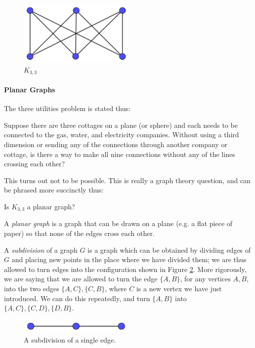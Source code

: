 	\begin{figure}[h]
		\centering
		\includegraphics[width=0.5\textwidth]{utilitygraph}
		\caption{\(K_{3,3}\)}
		\label{utilitygraph}
	\end{figure}
	
	\paragraph{Planar Graphs}
	
	The three utilities problem is stated thus:
	
	\begin{displayquote}
		Suppose there are three cottages on a plane (or sphere) and each needs to be connected to the gas, water, and electricity companies. Without using a third dimension or sending any of the connections through another company or cottage, is there a way to make all nine connections without any of the lines crossing each other?
	\end{displayquote}
	
	This turns out not to be possible. This is really a graph theory question, and can be phrased more succinctly thus:
	
	\begin{displayquote}
		Is \(K_{3,3}\) a planar graph?
	\end{displayquote}
	
	A \textit{planar graph} is a graph that can be drawn on a plane (e.g. a flat piece of paper) so that none of the edges cross each other.
	
	A \textit{subdivision} of a graph \(G\) is a graph which can be obtained by dividing edges of \(G\) and placing new points in the place where we have divided them; we are thus allowed to turn edges into the configuration shown in Figure \ref{subdivision}. More rigorously, we are saying that we are allowed to turn the edge \(\{A,B\}\), for any vertices \(A,B\), into the two edges \(\{A,C\},\{C,B\}\), where \(C\) is a new vertex we have just introduced. We can do this repeatedly, and turn \(\{A,B\}\) into \(\{A,C\},\{C,D\},\{D,B\}\).
	
	\begin{figure}[h]
		\centering
		\includegraphics[width=0.5\textwidth]{subdivision}
		\caption{A subdivision of a single edge.}
		\label{subdivision}
	\end{figure}
	
